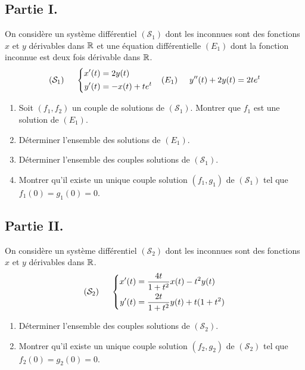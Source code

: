 \subsection*{Partie I.}
On considère un système différentiel $(\mathcal S_1)$ dont les inconnues sont des fonctions $x$ et $y$ dérivables dans $\mathbb{R}$ et une équation différentielle $(E_1)$ dont la fonction inconnue est deux fois dérivable dans $\mathbb{R}$.
\begin{align*}
 (\mathcal S_1)\hspace{0.5cm} 
\left\lbrace 
\begin{aligned}
 x'(t) &= 2y(t)\\
 y'(t) &= -x(t) +te^t
\end{aligned}
\right. 
& &
(E_1)\hspace{0.5cm} y''(t)+2y(t) = 2te^t
\end{align*}
\begin{enumerate}
 \item Soit $(f_1,f_2)$ un couple de solutions de $(\mathcal S_1)$. Montrer que $f_1$ est une solution de $(E_1)$.
 \item Déterminer l'ensemble des solutions de $(E_1)$.
 \item Déterminer l'ensemble des couples solutions de $(\mathcal S_1)$.
 \item Montrer qu'il existe un unique couple solution $(f_1, g_1)$ de $(\mathcal S_1)$ tel que $f_1(0)=g_1(0)=0$. 
\end{enumerate}

\subsection*{Partie II.}
On considère un système différentiel $(\mathcal S_2)$ dont les inconnues sont des fonctions $x$ et $y$ dérivables dans $\mathbb{R}$.
\begin{displaymath}
 (\mathcal S_2)\hspace{0.5cm} 
\left\lbrace 
\begin{aligned}
 x'(t) &= \frac{4t}{1+t^2}x(t)-t^2y(t)\\
 y'(t) &= \frac{2t}{1+t^2}y(t) +t(1+t^2)
\end{aligned}
\right. 
\end{displaymath}
\begin{enumerate}
 \item Déterminer l'ensemble des couples solutions de $(\mathcal S_2)$.
 \item Montrer qu'il existe un unique couple solution $(f_2, g_2)$ de $(\mathcal S_2)$ tel que $f_2(0)=g_2(0)=0$. 
\end{enumerate}


